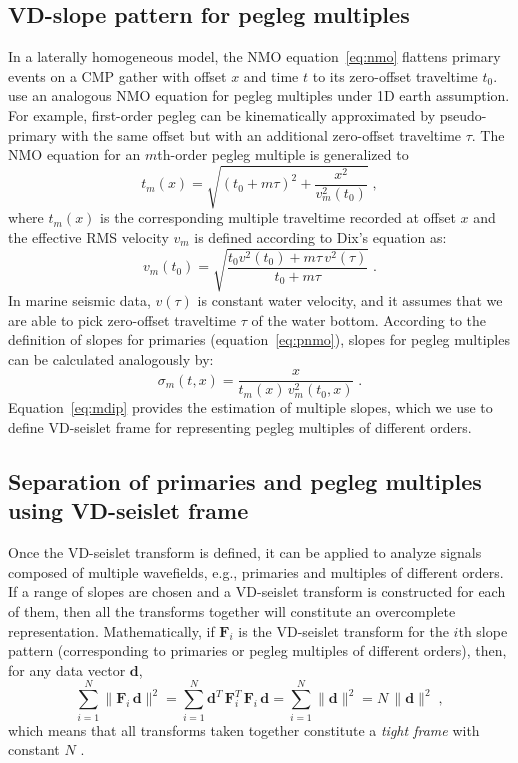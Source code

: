 \subsection{VD-slope pattern for pegleg multiples}

In a laterally homogeneous model, the NMO equation~\ref{eq:nmo}
flattens primary events on a CMP gather with offset $x$ and time $t$
to its zero-offset traveltime $t_0$. \cite{Brown05} use an analogous
NMO equation for pegleg multiples under  1D earth assumption. For
example, first-order pegleg can be kinematically approximated by
pseudo-primary with the same offset but with an additional zero-offset
traveltime $\tau$. The NMO equation for an $m$th-order pegleg multiple
is generalized to
\begin{equation}
  \label{eq:mnmo}
  t_m(x) = \sqrt{(t_0+m\tau)^2 + \frac{x^2}{v_m^2(t_0)}}\;,
\end{equation}
where $t_m(x)$ is the corresponding multiple traveltime recorded at
offset $x$ and the effective RMS velocity $v_m$ is
defined according to Dix's equation as:
\begin{equation}
  \label{eq:mveff}
  v_m(t_0) = \sqrt{\frac{t_0v^2(t_0)+m\tau\,v^2(\tau)}{t_0+m\tau}}\;.
\end{equation}
In marine seismic data, $v(\tau)$ is constant water velocity, and
it assumes that we are able to pick zero-offset traveltime
$\tau$ of the water bottom. According to the definition of slopes for
primaries (equation~\ref{eq:pnmo}), slopes for pegleg multiples can be
calculated analogously by:
\begin{equation}
  \sigma_m(t,x) = {\frac{x}{t_m(x)\,v_m^2(t_0,x)}}\;.
  \label{eq:mdip}
\end{equation}
Equation~\ref{eq:mdip} provides the estimation of multiple slopes,
which we use to define VD-seislet frame for representing pegleg
multiples of different orders.

\subsection{Separation of primaries and pegleg multiples using VD-seislet frame}
Once the VD-seislet transform is defined, it can be applied to analyze
signals composed of multiple wavefields, e.g., primaries and multiples
of different orders. If a range of slopes are chosen and a VD-seislet
transform is constructed for each of them, then all the transforms
together will constitute an overcomplete
representation. Mathematically, if $\mathbf{F}_i$ is the VD-seislet
transform for the $i$th slope pattern (corresponding to primaries or
pegleg multiples of different orders), then, for any data vector
$\mathbf{d}$,
\begin{equation}
\label{eq:frame}
\sum\limits_{i=1}^N \|\mathbf{F}_i\,\mathbf{d}\|^2 = 
\sum\limits_{i=1}^N \mathbf{d}^T\,\mathbf{F}_i^T\,\mathbf{F}_i\,\mathbf{d} =
\sum\limits_{i=1}^N \|\mathbf{d}\|^2 = N\,\|\mathbf{d}\|^2\;,
\end{equation}
which means that all transforms taken together constitute a 
\emph{tight frame} with constant $N$ \cite[]{mallat}.

